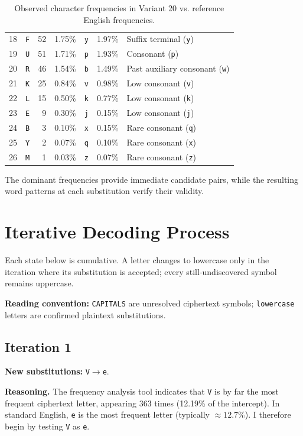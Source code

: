 \documentclass[11pt,a4paper]{article}
\newcommand{\caselegend}{%
  \noindent\textbf{Reading convention: }
  \texttt{CAPITALS} are unresolved ciphertext symbols; 
  \texttt{lowercase} letters are confirmed plaintext substitutions.\par
}
\begin{document}
\begin{table}[H]
\begin{tabular}{ccrcccl}
18 & \texttt{F} &  52 &  1.75\% & \texttt{y} & 1.97\%  & Suffix terminal (\texttt{y}) \\
19 & \texttt{U} &  51 &  1.71\% & \texttt{p} & 1.93\%  & Consonant (\texttt{p}) \\
20 & \texttt{R} &  46 &  1.54\% & \texttt{b} & 1.49\%  & Past auxiliary consonant (\texttt{w}) \\
21 & \texttt{K} &  25 &  0.84\% & \texttt{v} & 0.98\%  & Low consonant (\texttt{v}) \\
22 & \texttt{L} &  15 &  0.50\% & \texttt{k} & 0.77\%  & Low consonant (\texttt{k}) \\
23 & \texttt{E} &   9 &  0.30\% & \texttt{j} & 0.15\%  & Low consonant (\texttt{j}) \\
24 & \texttt{B} &   3 &  0.10\% & \texttt{x} & 0.15\%  & Rare consonant (\texttt{q}) \\
25 & \texttt{Y} &   2 &  0.07\% & \texttt{q} & 0.10\%  & Rare consonant (\texttt{x}) \\
26 & \texttt{M} &   1 &  0.03\% & \texttt{z} & 0.07\%  & Rare consonant (\texttt{z}) \\
\bottomrule
\end{tabular}
\caption{Observed character frequencies in Variant 20 vs. reference English frequencies.}
\label{tab:frequencies}
\end{table}

The dominant frequencies provide immediate candidate pairs, while the resulting word patterns at each substitution verify their validity.

\newpage
\section{Iterative Decoding Process}

Each state below is cumulative. A letter changes to lowercase only in the iteration where its substitution is accepted; every still-undiscovered symbol remains uppercase.

\caselegend

\subsection{Iteration 1}

\noindent\textbf{New substitutions:} \texttt{V}$\rightarrow$\texttt{e}.\par
\smallskip
\noindent\textbf{Reasoning.} The frequency analysis tool indicates that \texttt{V} is by far the most frequent ciphertext letter, appearing 363 times (12.19\% of the intercept). In standard English, \texttt{e} is the most frequent letter (typically $\approx 12.7\%$). I therefore begin by testing \texttt{V} as \texttt{e}.
\end{document}

